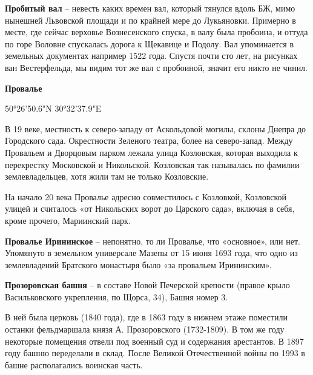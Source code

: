 \medskip

\textbf{Пробитый вал} – невесть каких времен вал, который тянулся вдоль БЖ, мимо нынешней Львовской площади и по крайней мере до Лукьяновки. Примерно в месте, где сейчас верховье Вознесенского спуска, в валу была пробоина, и оттуда по горе Воловне спускалась дорога к Щекавице и Подолу. Вал упоминается в земельных документах например 1522 года. Спустя почти сто лет, на рисунках ван Вестерфельда, мы видим тот же вал с пробоиной, значит его никто не чинил.\\ 

\medskip

\textbf{Провалье} 

50°26'50.6"N 30°32'37.9"E

В 19 веке, местность к северо-зап\-аду от Аскольдовой могилы, склоны Днепра до Городского сада. Окрестности Зеленого театра, более на северо-запад. Между Провальем и Дворцовым парком лежала улица Козловская, которая выходила к перекрестку Московской и Никольской. Козловская так называлась по фамилии землевладельцев, хотя жили там не только Козловские.

На начало 20 века Провалье адресно совместилось с Козловкой, Козловской улицей и считалось «от Никольских ворот до Царского сада», включая в себя, кроме прочего, Мариинский парк.\\

\medskip

\textbf{Провалье Ирининское} – непонятно, то ли Провалье, что «основное», или нет. Упомянуто в земельном универсале Мазепы от 15 июня 1693 года, что одно из землевладений Братского монастыря было «за провальем Ирининским».\\

\medskip

\textbf{Прозоровская башня} – в составе Новой Печерской крепости (правое крыло Васильковского укрепления, по Щорса, 34), Башня номер 3.

В ней была церковь (1840 года), где в 1863 году в нижнем этаже поместили останки фельдмаршала князя А. Прозоровского (1732-1809). В том же году некоторые помещения отвели под военный суд и содержания арестантов. В 1897 году башню переделали в склад. После Великой Отечественной войны по 1993 в башне располагались воинская часть.\\


